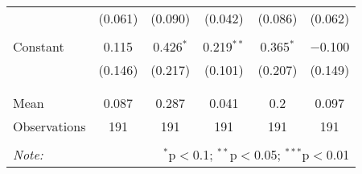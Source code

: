 \begin{tabular}{@{\extracolsep{5pt}}lccccc}
  & (0.061) & (0.090) & (0.042) & (0.086) & (0.062) \\ 
  & & & & & \\ 
 Constant & 0.115 & 0.426$^{*}$ & 0.219$^{**}$ & 0.365$^{*}$ & $-$0.100 \\ 
  & (0.146) & (0.217) & (0.101) & (0.207) & (0.149) \\ 
  & & & & & \\ 
\hline \\[-1.8ex] 
Mean & 0.087 & 0.287 & 0.041 & 0.2 & 0.097 \\ 
Observations & 191 & 191 & 191 & 191 & 191 \\ 
\hline 
\hline \\[-1.8ex] 
\textit{Note:}  & \multicolumn{5}{r}{$^{*}$p$<$0.1; $^{**}$p$<$0.05; $^{***}$p$<$0.01} \\ 
\end{tabular} 
